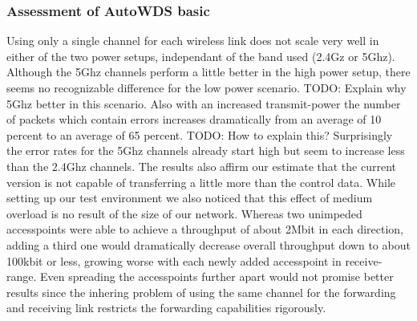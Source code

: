     \subsubsection{Assessment of AutoWDS basic}
      Using only a single channel for each wireless link does not scale very well in either of the two power setups, independant of the band used (2.4Gz or 5Ghz).
      Although the 5Ghz channels perform a little better in the high power setup, there seems no recognizable difference for the low power scenario.
      TODO: Explain why 5Ghz better in this scenario.
      Also with an increased transmit-power the number of packets which contain errors increases dramatically from an average of 10 percent to an average of 
      65 percent. TODO: How to explain this?
      Surprisingly the error rates for the 5Ghz channels already start high but seem to increase less than the 2.4Ghz channels.
      The results also affirm our estimate that the current version is not capable of transferring a little more than the control data.
      While setting up our test environment we also noticed that this effect of medium overload is no result of the size of our network.
      Whereas two unimpeded accesspoints were able to achieve a throughput of about 2Mbit in each direction, adding a third one would dramatically 
      decrease overall throughput down to about 100kbit or less, growing worse with each newly added accesspoint in receive-range. Even spreading the 
      accesspoints further apart would not promise better results since the inhering problem of using the same channel for the forwarding and receiving 
      link restricts the forwarding capabilities rigorously.
